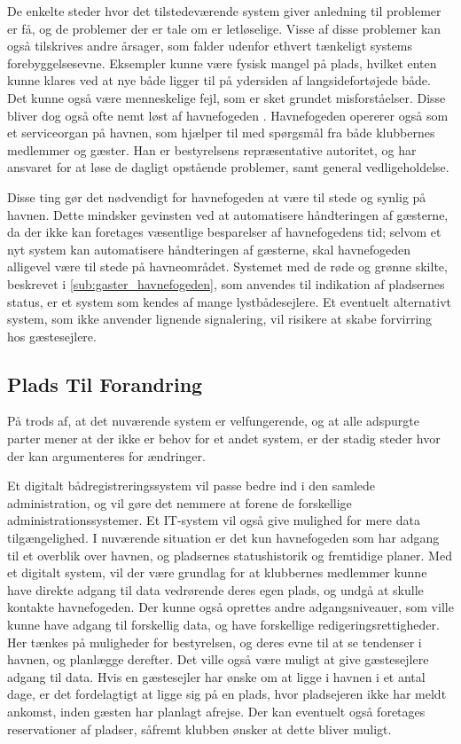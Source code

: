 De enkelte steder hvor det tilstedeværende system giver anledning til problemer er få, og de problemer der er tale om er letløselige. Visse af disse problemer kan også tilskrives andre årsager, som falder udenfor ethvert tænkeligt systems forebyggelsesevne. Eksempler kunne være fysisk mangel på plads, hvilket enten kunne klares ved at nye både ligger til på ydersiden af langsidefortøjede både. Det kunne også være menneskelige fejl, som er sket grundet misforståelser. Disse bliver dog også ofte nemt løst af havnefogeden \cite{int_hf}. Havnefogeden opererer også som et serviceorgan på havnen, som hjælper til med spørgsmål fra både klubbernes medlemmer og gæster. Han er bestyrelsens repræsentative autoritet, og har ansvaret for at løse de dagligt opstående problemer, samt general vedligeholdelse. 

Disse ting gør det nødvendigt for havnefogeden at være til stede og synlig på havnen. Dette mindsker gevinsten ved at automatisere håndteringen af gæsterne, da der ikke kan foretages væsentlige besparelser af havnefogedens tid; selvom et nyt system kan automatisere håndteringen af gæsterne, skal havnefogeden alligevel være til stede på havneområdet. Systemet med de røde og grønne skilte, beskrevet i \cref{sub:gaster_havnefogeden}, som anvendes til indikation af pladsernes status, er et system som kendes af mange lystbådesejlere. Et eventuelt alternativt system, som ikke anvender lignende signalering, vil risikere at skabe forvirring hos gæstesejlere.

\subsection{Plads Til Forandring}

På trods af, at det nuværende system er velfungerende, og at alle adspurgte parter mener at der ikke er behov for et andet system, er der stadig steder hvor der kan argumenteres for ændringer.

Et digitalt bådregistreringssystem vil passe bedre ind i den samlede administration, og vil gøre det nemmere at forene de forskellige administrationssystemer. Et IT-system vil også give mulighed for mere data tilgængelighed. I nuværende situation er det kun havnefogeden som har adgang til et overblik over havnen, og pladsernes statushistorik og fremtidige planer. Med et digitalt system, vil der være grundlag for at klubbernes medlemmer kunne have direkte adgang til data vedrørende deres egen plads, og undgå at skulle kontakte havnefogeden. Der kunne også oprettes andre adgangsniveauer, som ville kunne have adgang til forskellig data, og have forskellige redigeringsrettigheder. Her tænkes på muligheder for bestyrelsen, og deres evne til at se tendenser i havnen, og planlægge derefter. Det ville også være muligt at give gæstesejlere adgang til data. Hvis en gæstesejler har ønske om at ligge i havnen i et antal dage, er det fordelagtigt at ligge sig på en plads, hvor pladsejeren ikke har meldt ankomst, inden gæsten har planlagt afrejse. Der kan eventuelt også foretages reservationer af pladser, såfremt klubben ønsker at dette bliver muligt.

